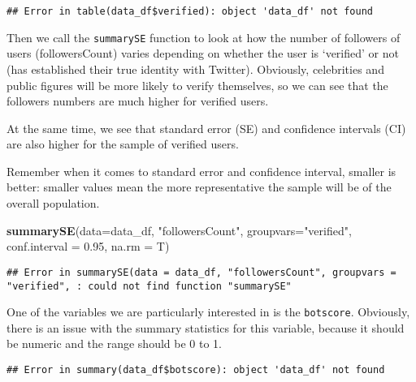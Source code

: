 \documentclass[]{article}
\newenvironment{Shaded}{\begin{snugshade}}{\end{snugshade}}
\newcommand{\DataTypeTok}[1]{\textcolor[rgb]{0.13,0.29,0.53}{#1}}
\newcommand{\FloatTok}[1]{\textcolor[rgb]{0.00,0.00,0.81}{#1}}
\newcommand{\KeywordTok}[1]{\textcolor[rgb]{0.13,0.29,0.53}{\textbf{#1}}}
\newcommand{\NormalTok}[1]{#1}
\newcommand{\OperatorTok}[1]{\textcolor[rgb]{0.81,0.36,0.00}{\textbf{#1}}}
\newcommand{\StringTok}[1]{\textcolor[rgb]{0.31,0.60,0.02}{#1}}
\begin{document}
\begin{verbatim}
## Error in table(data_df$verified): object 'data_df' not found
\end{verbatim}

Then we call the \texttt{summarySE} function to look at how the number
of followers of users (followersCount) varies depending on whether the
user is `verified' or not (has established their true identity with
Twitter). Obviously, celebrities and public figures will be more likely
to verify themselves, so we can see that the followers numbers are much
higher for verified users.

At the same time, we see that standard error (SE) and confidence
intervals (CI) are also higher for the sample of verified users.

Remember when it comes to standard error and confidence interval,
smaller is better: smaller values mean the more representative the
sample will be of the overall population.

\begin{Shaded}
\begin{Highlighting}[]
\KeywordTok{summarySE}\NormalTok{(}\DataTypeTok{data=}\NormalTok{data_df,}
          \StringTok{"followersCount"}\NormalTok{,}
          \DataTypeTok{groupvars=}\StringTok{"verified"}\NormalTok{,}
          \DataTypeTok{conf.interval =} \FloatTok{0.95}\NormalTok{, }\DataTypeTok{na.rm =}\NormalTok{ T)}
\end{Highlighting}
\end{Shaded}

\begin{verbatim}
## Error in summarySE(data = data_df, "followersCount", groupvars = "verified", : could not find function "summarySE"
\end{verbatim}

One of the variables we are particularly interested in is the
\texttt{botscore}. Obviously, there is an issue with the summary
statistics for this variable, because it should be numeric and the range
should be 0 to 1.

\begin{Shaded}
\end{Shaded}

\begin{verbatim}
## Error in summary(data_df$botscore): object 'data_df' not found
\end{verbatim}
\end{document}
